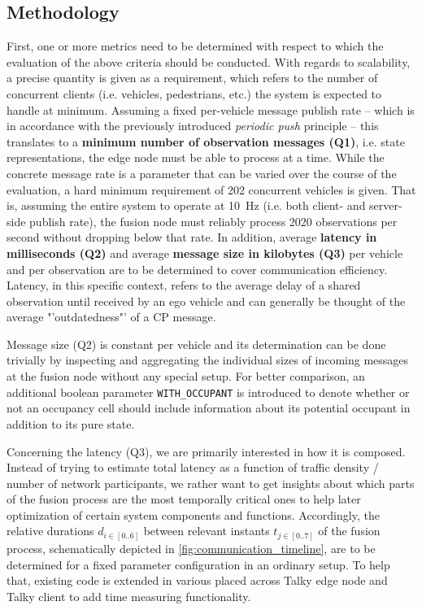\subsection{Methodology}
\label{subsec:evaluation:performance_evaluation:methodology}
First, one or more metrics need to be determined with respect to which the evaluation of the above criteria should be conducted. With regards to scalability, a precise quantity is given as a requirement, which refers to the number of concurrent clients (i.e. vehicles, pedestrians, etc.) the system is expected to handle at minimum. Assuming a fixed per-vehicle message publish rate – which is in accordance with the previously introduced \textit{periodic push} principle – this translates to a \textbf{minimum number of observation messages (Q1)}, i.e. state representations, the edge node must be able to process at a time. While the concrete message rate is a parameter that can be varied over the course of the evaluation, a hard minimum requirement of 202 concurrent vehicles is given. That is, assuming the entire system to operate at \SI{10}{Hz} (i.e. both client- and server-side publish rate), the fusion node must reliably process 2020 observations per second without dropping below that rate. In addition, average \textbf{latency in milliseconds (Q2)} and average \textbf{message size in kilobytes (Q3)} per vehicle and per observation are to be determined to cover communication efficiency. Latency, in this specific context, refers to the average delay of a shared observation until received by an ego vehicle and can generally be thought of the average "'outdatedness"' of a CP message.
\par
\bigskip

Message size (Q2) is constant per vehicle and its determination can be done trivially by inspecting and aggregating the individual sizes of incoming messages at the fusion node without any special setup. For better comparison, an additional boolean parameter \texttt{WITH\_OCCUPANT} is introduced to denote whether or not an occupancy cell should include information about its potential occupant in addition to its pure state.
\par
\bigskip

Concerning the latency (Q3), we are primarily interested in how it is composed. Instead of trying to estimate total latency as a function of traffic density / number of network participants, we rather want to get insights about which parts of the fusion process are the most temporally critical ones to help later optimization of certain system components and functions. Accordingly, the relative durations $d_{i \in [0..6]}$ between relevant instants $t_{j \in [0..7]}$ of the fusion process, schematically depicted in \cref{fig:communication_timeline}, are to be determined for a fixed parameter configuration in an ordinary setup. To help that, existing code is extended in various placed across Talky edge node and Talky client to add time measuring functionality.
\par
\bigskip

